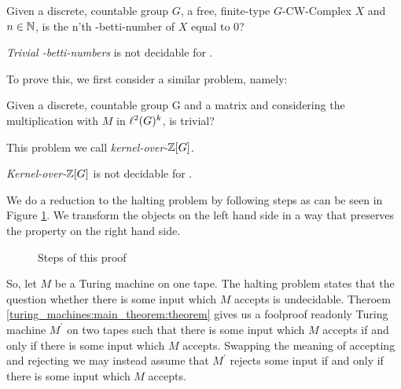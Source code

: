 \begin{Problem}
	Given a discrete, countable group $G$, a free, finite-type $G$-CW-Complex $X$ and $n \in \mathbb{N}$, is the n'th \ltwo-betti-number of $X$ equal to 0?
\end{Problem}

\begin{Theorem}
	\label{zero-divisor-problem:trivial_betti_numbers}
	\emph{Trivial \ltwo-betti-numbers} is not decidable for .
\end{Theorem}

To prove this, we first consider a similar problem, namely:

\begin{Problem}
	Given a discrete, countable group G and a matrix 
	and considering the multiplication with $M$ in $\ell^2(G)^k$, is  trivial?
\end{Problem}

This problem we call \emph{kernel-over-$\mathbb{Z}[G]$}.

\begin{Theorem}
	\label{zero-divisor-problem:kernel-over-zg}
	\emph{Kernel-over-$\mathbb{Z}[G]$} is not decidable for .
\end{Theorem}

\proof
	We do a reduction to the halting problem by following steps as can be seen in Figure \ref{zero_divisor_problem:main_theorem:fig_proof_plan}.
	We transform the objects on the left hand side in a way that preserves the property on the right hand side.

	\begin{figure}[h]
		\centering
		
		\caption{Steps of this proof}
		\label{zero_divisor_problem:main_theorem:fig_proof_plan}
	\end{figure}

	So, let $M$ be a Turing machine on one tape.
	The halting problem states that the question whether there is some input which $M$ accepts is undecidable.
	Theroem \ref{turing_machines:main_theorem:theorem} gives us a foolproof readonly Turing machine $M^\prime$ on two tapes such that there is some input which $M$ accepts if and only if there is some input which $M$ accepts.\footnotemark
	Swapping the meaning of accepting and rejecting we may instead assume that $M^\prime$ rejects some input if and only if there is some input which $M$ accepts.

